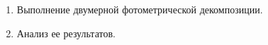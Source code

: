 \begin{enumerate}
    \item Выполнение двумерной фотометрической декомпозиции.
    \item Анализ ее результатов.

\end{enumerate}